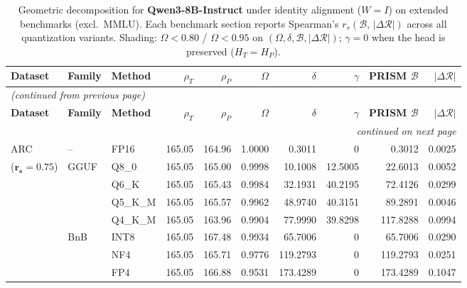 \begingroup
\small
\setlength{\tabcolsep}{4pt}
\renewcommand{\arraystretch}{1.05}
\setlength{\LTcapwidth}{\textwidth}
\begin{longtable}{ll l rrrrrrr}
\caption{Geometric decomposition for \textbf{Qwen3-8B-Instruct} under identity alignment ($W{=}I$) on extended benchmarks (excl.\ MMLU). Each benchmark section reports Spearman's $r_s(\mathcal{B},\,|\Delta\mathcal{R}|)$ across all quantization variants. Shading: \colorbox{red!35}{$\Omega{<}0.80$} / \colorbox{red!18}{$\Omega{<}0.95$} on $(\Omega,\delta,\mathcal{B},|\Delta\mathcal{R}|)$; \colorbox{cyan!12}{$\gamma{=}0$} when the head is preserved ($H_T{=}H_P$).}\label{tab:qwen_instruct_decomposition_ext_bound}\\
\toprule
\textbf{Dataset} & \textbf{Family} & \textbf{Method} & \textbf{$\rho_T$} & \textbf{$\rho_P$} & \textbf{$\Omega$} & \textbf{$\delta$} & \textbf{$\gamma$} & \textbf{PRISM $\mathcal{B}$} & \textbf{$|\Delta\mathcal{R}|$} \\
\midrule
\endfirsthead
\multicolumn{10}{l}{\small\itshape (continued from previous page)}\\
\toprule
\textbf{Dataset} & \textbf{Family} & \textbf{Method} & \textbf{$\rho_T$} & \textbf{$\rho_P$} & \textbf{$\Omega$} & \textbf{$\delta$} & \textbf{$\gamma$} & \textbf{PRISM $\mathcal{B}$} & \textbf{$|\Delta\mathcal{R}|$} \\
\midrule
\endhead
\midrule
\multicolumn{10}{r}{\small\itshape continued on next page}\\
\endfoot
\bottomrule
\endlastfoot
ARC & -- & FP16 & 165.05 & 164.96 & 1.0000 & 0.3011 & \cellcolor{cyan!12} $0$ & 0.3012 & 0.0025 \\
{\small ($\mathbf{r_s{=}0.75}$)} & GGUF & Q8\_0 & 165.05 & 165.00 & 0.9998 & 10.1008 & 12.5005 & 22.6013 & 0.0052 \\
 &  & Q6\_K & 165.05 & 165.43 & 0.9984 & 32.1931 & 40.2195 & 72.4126 & 0.0299 \\
 &  & Q5\_K\_M & 165.05 & 165.57 & 0.9962 & 48.9740 & 40.3151 & 89.2891 & 0.0046 \\
 &  & Q4\_K\_M & 165.05 & 163.96 & 0.9904 & 77.9990 & 39.8298 & 117.8288 & 0.0994 \\
 & BnB & INT8 & 165.05 & 167.48 & 0.9934 & 65.7006 & \cellcolor{cyan!12} $0$ & 65.7006 & 0.0290 \\
 &  & NF4 & 165.05 & 165.71 & 0.9776 & 119.2793 & \cellcolor{cyan!12} $0$ & 119.2793 & 0.0251 \\
 &  & FP4 & 165.05 & 166.88 & 0.9531 & 173.4289 & \cellcolor{cyan!12} $0$ & 173.4289 & 0.1047 \\

\end{longtable}
